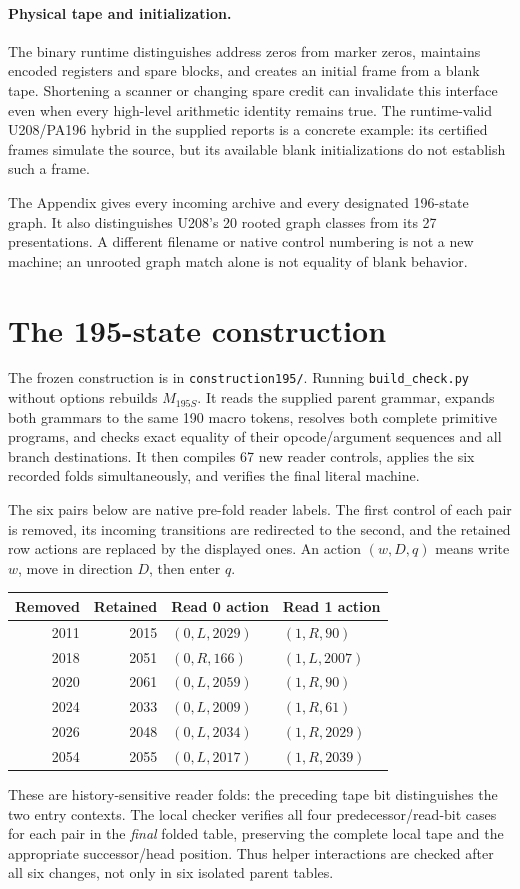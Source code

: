 \documentclass[11pt,a4paper]{article}
\newcommand{\file}[1]{\texttt{\nolinkurl{#1}}}
\begin{document}
\paragraph{Physical tape and initialization.}
The binary runtime distinguishes address zeros from marker zeros,
maintains encoded registers and spare blocks, and creates an initial
frame from a blank tape. Shortening a scanner or changing spare credit
can invalidate this interface even when every high-level arithmetic
identity remains true. The runtime-valid U208/PA196 hybrid in the
supplied reports is a concrete example: its certified frames simulate
the source, but its available blank initializations do not establish
such a frame.

The Appendix gives every incoming archive and every designated 196-state
graph. It also distinguishes U208's 20 rooted graph classes from its 27
presentations. A different filename or native control numbering is not
a new machine; an unrooted graph match alone is not equality of blank
behavior.

\section{The 195-state construction}\label{sec:195}

The frozen construction is in \file{construction195/}. Running
\file{build_check.py} without options rebuilds $M_{195S}$.
It reads the supplied parent grammar, expands both grammars to the
same 190 macro tokens, resolves both complete primitive programs,
and checks exact equality of their opcode/argument sequences and
all branch destinations. It then compiles 67 new reader controls,
applies the six recorded folds simultaneously, and verifies the final
literal machine.

The six pairs below are native pre-fold reader labels. The first control
of each pair is removed, its incoming transitions are redirected to
the second, and the retained row actions are replaced by the displayed
ones. An action $(w,D,q)$ means write $w$, move in direction $D$, then
enter $q$.
\begin{center}
\begin{tabular}{@{}rrll@{}}
\toprule
Removed & Retained & Read 0 action & Read 1 action\\
\midrule
2011&2015&$(0,L,2029)$&$(1,R,90)$\\
2018&2051&$(0,R,166)$&$(1,L,2007)$\\
2020&2061&$(0,L,2059)$&$(1,R,90)$\\
2024&2033&$(0,L,2009)$&$(1,R,61)$\\
2026&2048&$(0,L,2034)$&$(1,R,2029)$\\
2054&2055&$(0,L,2017)$&$(1,R,2039)$\\
\bottomrule
\end{tabular}
\end{center}
These are history-sensitive reader folds: the preceding tape bit
distinguishes the two entry contexts. The local checker verifies all
four predecessor/read-bit cases for each pair in the \emph{final}
folded table, preserving the complete local tape and the appropriate
successor/head position. Thus helper interactions are checked after
all six changes, not only in six isolated parent tables.
\end{document}
